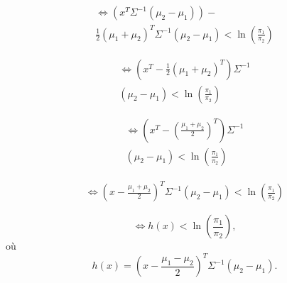 \documentclass{article}
\begin{document}
\begin{multicols}{2}
\[
\begin{split}
\iff \left(x^T \Sigma^{-1} ( \mu_2 - \mu_1 ) \right) - \\
\frac{1}{2} (\mu_1 + \mu_2)^T \Sigma^{-1}  (\mu_2 - \mu_1) < \ln \left( \frac{\pi_1}{\pi_2} \right)
\end{split}
\]


\[
\begin{split}
\iff \left( x^T - \frac{1}{2} (\mu_1 + \mu_2)^T \right) \Sigma^{-1} \\ 
( \mu_2 - \mu_1 ) < \ln \left( \frac{\pi_1}{\pi_2} \right)
\end{split}
\]

\[
\begin{split}
\iff \left( x^T - \left(\frac{\mu_1 + \mu_2}{2}\right)^T \right) \Sigma^{-1} \\
( \mu_2 - \mu_1 ) < \ln \left( \frac{\pi_1}{\pi_2} \right)
\end{split}
\]

\[
\begin{split}
\iff \left( x - \frac{\mu_1 + \mu_2}{2} \right)^T \Sigma^{-1} ( \mu_2 - \mu_1 ) < \ln \left( \frac{\pi_1}{\pi_2} \right)
\end{split}
\]

\[
\iff
h(x) < \ln(\frac{\pi_1}{\pi_2}),
\]
où
\[
h(x) = (x -  \frac{\mu_1 - \mu_2}{2})^{T}  \Sigma^{-1} (\mu_2 - \mu_1).
\]

\end{multicols}
\end{document}
